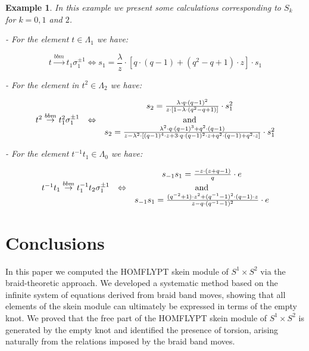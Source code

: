 \documentclass[11pt]{amsart}
\newtheorem{ex}{Example}
\begin{document}
\begin{ex}\rm
In this example we present some calculations corresponding to $S_k$ for $k=0, 1$ and $2$.

\smallbreak

- For the element $t \in \Lambda_1$ we have:

\[
t\overset{bbm}{\rightarrow}t_1\sigma_1^{\pm 1} \Leftrightarrow s_{1}=\frac{\lambda}{z}\cdot \left[q\cdot (q-1)+(q^2-q+1)\cdot z \right]\cdot s_{1}
\]

\bigbreak

- For the element in $t^2 \in \Lambda_2$ we have:

\[
\begin{matrix}
	 
	& & s_2 = \frac{\lambda\cdot q\cdot (q-1)^2}{z\cdot \left[1-\lambda\cdot (q^2-q+1) \right]}\cdot s_1^2 \\
	
t^2 \overset{bbm}\rightarrow t_1^{2}\sigma_1^{\pm 1} & \Leftrightarrow & {\rm and}\\
		
	& &	s_2 = \frac{\lambda^2\cdot q\cdot (q-1)^3+q^2\cdot (q-1)}{z-\lambda^2\cdot \left[(q-1)^4\cdot z+3\cdot q\cdot (q-1)^2\cdot z+ q^2\cdot (q-1)+q^2\cdot z \right]}\cdot s_1^2\\
	\end{matrix}
\]

\bigbreak

- For the element $t^{-1}t_1 \in \Lambda_0$ we have:

\[
\begin{matrix}
	 
	& & s_{-1}s_1 = \frac{-z\cdot ( z+q-1 )}{q}\cdot e \\
	
t^{-1}t_1 \overset{bbm}\rightarrow t_1^{-1}t_2\sigma_1^{\pm 1} & \Leftrightarrow & {\rm and}\\
		
	& &	s_{-1}s_1 = \frac{(q^{-2}+1)\cdot z^2+(q^{-1}-1)^2\cdot (q-1)\cdot z}{z-q\cdot (q^{-1}-1)^2}\cdot e\\
	\end{matrix}
\]
\end{ex}




\section{Conclusions}

In this paper we computed the HOMFLYPT skein module of \(S^1 \times S^2\) via the braid-theoretic approach. We developed a systematic method based on the infinite system of equations derived from braid band moves, showing that all elements of the skein module can ultimately be expressed in terms of the empty knot. We proved that the free part of the HOMFLYPT skein module of \(S^1 \times S^2\) is generated by the empty knot and identified the presence of torsion, arising naturally from the relations imposed by the braid band moves.
\end{document}
